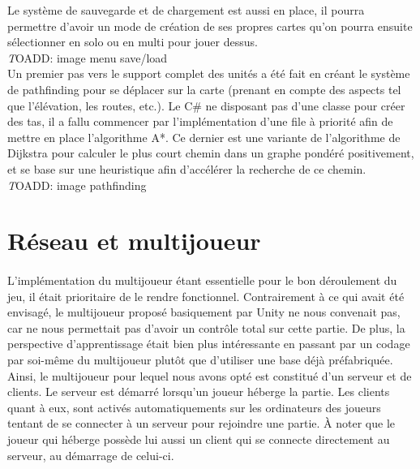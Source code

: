 \documentclass[12pt]{report}
\begin{document}
Le système de sauvegarde et de chargement est aussi en place, il pourra permettre d’avoir un mode de création de ses propres cartes qu’on pourra ensuite sélectionner en solo ou en multi pour jouer dessus.\\

\textit TOADD: image menu save/load\\

Un premier pas vers le support complet des unités a été fait en créant le système de pathfinding pour se déplacer sur la carte (prenant en compte des aspects tel que l’élévation, les routes, etc.). Le C# ne disposant pas d’une classe pour créer des tas, il a fallu commencer par l’implémentation d’une file à priorité afin de mettre en place l’algorithme A*. Ce dernier est une variante de l’algorithme de Dijkstra pour calculer le plus court chemin dans un graphe pondéré positivement, et se base sur une heuristique afin d’accélérer la recherche de ce chemin.\\

\textit TOADD: image pathfinding\\


\newpage

\section{Réseau et multijoueur}

\paragraph{}
L’implémentation du multijoueur étant essentielle pour le bon déroulement du jeu, il était prioritaire de le rendre fonctionnel. Contrairement à ce qui avait été envisagé, le multijoueur proposé basiquement par Unity ne nous convenait pas, car ne nous permettait pas d’avoir un contrôle total sur cette partie. De plus, la perspective d’apprentissage était bien plus intéressante en passant par un codage par soi-même du multijoueur plutôt que d’utiliser une base déjà préfabriquée. 
Ainsi, le multijoueur pour lequel nous avons opté est constitué d’un serveur et de clients. Le serveur est démarré lorsqu’un joueur héberge la partie. Les clients quant à eux, sont activés automatiquements sur les ordinateurs des joueurs tentant de se connecter à un serveur pour rejoindre une partie. À noter que le joueur qui héberge possède lui aussi un client qui se connecte directement au serveur, au démarrage de celui-ci.\\
\end{document}
